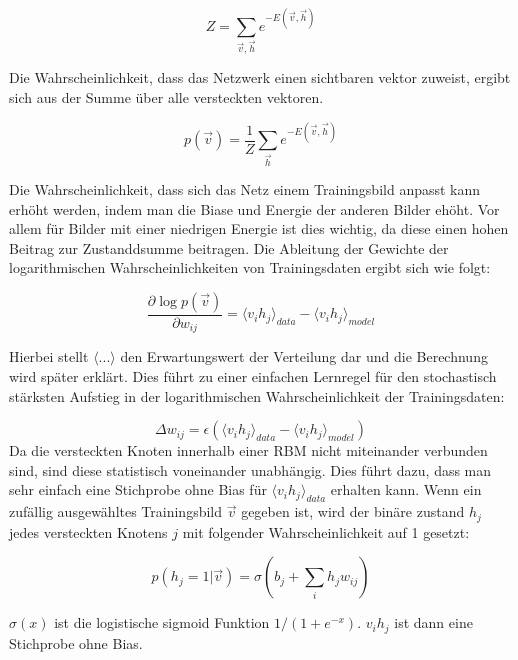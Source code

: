 \documentclass[12pt]{article}
\begin{document}
\begin{equation}
Z=\sum_{\vec{v},\vec{h}} e^{-E(\vec{v},\vec{h})}
\end{equation}

Die Wahrscheinlichkeit, dass das Netzwerk einen sichtbaren vektor zuweist, ergibt sich aus der Summe über alle versteckten vektoren. \cite{guide}

\begin{equation}
p(\vec{v})= \frac{1}{Z} \sum_{\vec{h}} e^{-E(\vec{v},\vec{h})}
\end{equation}

Die Wahrscheinlichkeit, dass sich das Netz einem Trainingsbild anpasst kann erhöht werden, indem man die Biase und Energie der anderen Bilder ehöht. Vor allem für Bilder mit einer niedrigen Energie ist dies wichtig, da diese einen hohen Beitrag zur Zustanddsumme beitragen. Die Ableitung der Gewichte der logarithmischen Wahrscheinlichkeiten von Trainingsdaten ergibt sich wie folgt:

\begin{equation}
\frac{\partial \log p(\vec{v})}{\partial w_{ij}} = \langle v_ih_j \rangle_{data} - \langle v_i h_j \rangle_{model}
\end{equation}

Hierbei stellt $\langle...\rangle$ den Erwartungswert der Verteilung dar und die Berechnung wird später erklärt. Dies führt zu einer einfachen Lernregel für den stochastisch stärksten Aufstieg in der logarithmischen Wahrscheinlichkeit der Trainingsdaten:

\begin{equation}
\Delta w_{ij} = \epsilon\left( \langle v_i h_j \rangle_{data} - \langle v_i h_j \rangle_{model} \right)
\end{equation}
Da die versteckten Knoten innerhalb einer RBM nicht miteinander verbunden sind, sind diese statistisch voneinander unabhängig. Dies führt dazu, dass man sehr einfach eine Stichprobe ohne Bias für $\langle v_i h_j \rangle_{data}$ erhalten kann. Wenn ein zufällig ausgewähltes Trainingsbild $\vec{v}$ gegeben ist, wird der binäre zustand $h_j$ jedes versteckten Knotens $j$ mit folgender Wahrscheinlichkeit auf 1 gesetzt:

\begin{equation}
p(h_j = 1 | \vec{v}) = \sigma (b_j + \sum_{i} h_j w_{ij})
\label{ph}
\end{equation}

$\sigma(x)$ ist die logistische sigmoid Funktion $1/(1+e^{-x})$. $v_ih_j$ ist dann eine Stichprobe ohne Bias.
\end{document}
